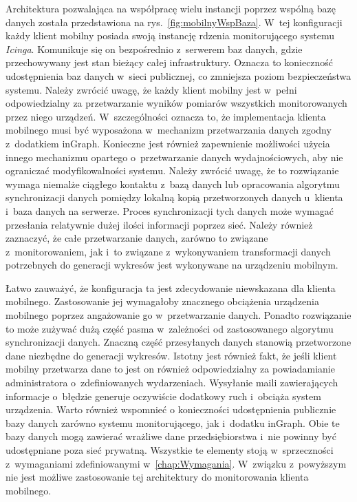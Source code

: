 Architektura pozwalająca na współpracę wielu instancji poprzez wspólną
bazę danych została przedstawiona na
rys.~\ref{fig:mobilnyWspBaza}. W~tej konfiguracji każdy klient mobilny
posiada swoją instancję rdzenia monitorującego systemu {\em
  Icinga}. Komunikuje się on bezpośrednio z~serwerem baz danych, gdzie
przechowywany jest stan bieżący całej infrastruktury. Oznacza to
konieczność udostępnienia baz danych w~sieci publicznej, co zmniejsza
poziom bezpieczeństwa systemu. Należy zwrócić uwagę, że każdy klient
mobilny jest w~pełni odpowiedzialny za przetwarzanie wyników pomiarów
wszystkich monitorowanych przez niego urządzeń. W~szczególności
oznacza to, że implementacja klienta mobilnego musi być wyposażona
w~mechanizm przetwarzania danych zgodny z~dodatkiem inGraph. Konieczne
jest również zapewnienie możliwości użycia innego mechanizmu opartego
o~przetwarzanie danych wydajnościowych, aby nie ograniczać
modyfikowalności systemu. Należy zwrócić uwagę, że to rozwiązanie
wymaga niemalże ciągłego kontaktu z~bazą danych lub opracowania
algorytmu synchronizacji danych pomiędzy lokalną kopią przetworzonych
danych u~klienta i~baza danych na serwerze. Proces synchronizacji tych
danych może wymagać przesłania relatywnie dużej ilości informacji
poprzez sieć. Należy również zaznaczyć, że całe przetwarzanie danych,
zarówno to związane z~monitorowaniem, jak i~to związane z~wykonywaniem
transformacji danych potrzebnych do generacji wykresów jest wykonywane
na urządzeniu mobilnym.

Łatwo zauważyć, że konfiguracja ta jest zdecydowanie niewskazana dla
klienta mobilnego. Zastosowanie jej wymagałoby znacznego obciążenia
urządzenia mobilnego poprzez angażowanie go w~przetwarzanie
danych. Ponadto rozwiązanie to może zużywać dużą część pasma
w~zależności od zastosowanego algorytmu synchronizacji danych. Znaczną
część przesyłanych danych stanowią przetworzone dane niezbędne do
generacji wykresów. Istotny jest również fakt, że jeśli klient mobilny
przetwarza dane to jest on również odpowiedzialny za powiadamianie
administratora o~zdefiniowanych wydarzeniach. Wysyłanie maili
zawierających informacje o~błędzie generuje oczywiście dodatkowy ruch
i~obciąża system urządzenia. Warto również wspomnieć o konieczności
udostępnienia publicznie bazy danych zarówno systemu monitorującego,
jak i~dodatku inGraph. Obie te bazy danych mogą zawierać wrażliwe dane
przedsiębiorstwa i~nie powinny być udostępniane poza sieć
prywatną. Wszystkie te elementy stoją w~sprzeczności z~wymaganiami
zdefiniowanymi w~\ref{chap:Wymagania}. W~związku z~powyższym nie jest
możliwe zastosowanie tej architektury do monitorowania klienta
mobilnego.

